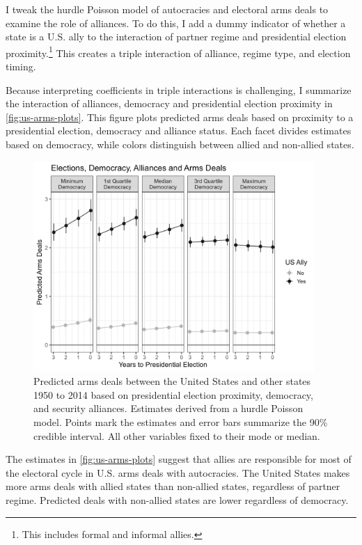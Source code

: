 \documentclass[12pt]{article}
\begin{document}
I tweak the hurdle Poisson model of autocracies and electoral arms deals to examine the role of alliances. 
To do this, I add a dummy indicator of whether a state is a U.S. ally to the interaction of partner regime and presidential election proximity.\footnote{This includes formal and informal allies.}
This creates a triple interaction of alliance, regime type, and election timing. 


Because interpreting coefficients in triple interactions is challenging, I summarize the interaction of alliances, democracy and presidential election proximity in \autoref{fig:us-arms-plots}.
This figure plots predicted arms deals based on proximity to a presidential election, democracy and alliance status. 
Each facet divides estimates based on democracy, while colors distinguish between allied and non-allied states. 


\begin{figure}[htpb]
	\centering
		\includegraphics[width=0.95\textwidth]{../figures/us-arms-plots.png}
	\caption{Predicted arms deals between the United States and other states 1950 to 2014 based on presidential election proximity, democracy, and security alliances. Estimates derived from a hurdle Poisson model. Points mark the estimates and error bars summarize the 90\% credible interval. All other variables fixed to their mode or median.}
	\label{fig:us-arms-plots}
\end{figure}


The estimates in \autoref{fig:us-arms-plots} suggest that allies are responsible for most of the electoral cycle in U.S. arms deals with autocracies. 
The United States makes more arms deals with allied states than non-allied states, regardless of partner regime. 
Predicted deals with non-allied states are lower regardless of democracy. 
\end{document}
